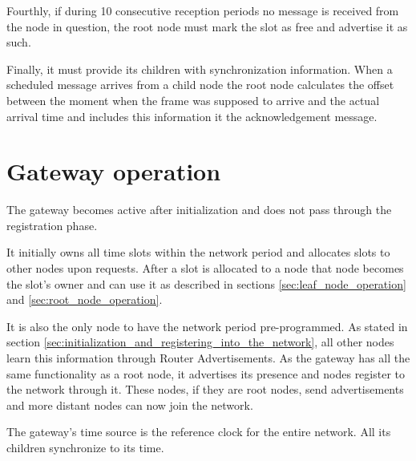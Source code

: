 Fourthly, if during 10 consecutive reception periods no message is received
from the node in question, the root node must mark the slot as free and
advertise it as such.

Finally, it must provide its children with synchronization information. When a
scheduled message arrives from a child node the root node calculates the offset
between the moment when the frame was supposed to arrive and the actual arrival
time and includes this information it the acknowledgement message.

\section{Gateway operation}

The gateway becomes active after initialization and does not pass through the
registration phase.

It initially owns all time slots within the network period and allocates slots
to other nodes upon requests. After a slot is allocated to a node that node
becomes the slot's owner and can use it as described in sections
\ref{sec:leaf_node_operation} and \ref{sec:root_node_operation}.

It is also the only node to have the network period pre-programmed. As stated
in section \ref{sec:initialization_and_registering_into_the_network}, all other
nodes learn this information through Router Advertisements. As the gateway has
all the same functionality as a root node, it advertises its presence and nodes
register to the network through it. These nodes, if they are root nodes, send
advertisements and more distant nodes can now join the network.

The gateway's time source is the reference clock for the entire network. All
its children synchronize to its time. 

